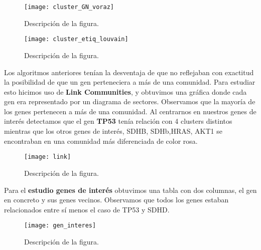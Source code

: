 \begin{figure}
	\centering
	\texttt{[image: cluster\_GN\_voraz]}
	\caption{Descripción de la figura.}
	\label{fig:cluster_GN_voraz}
\end{figure} 

\begin{figure}
	\centering
	\texttt{[image: cluster\_etiq\_louvain]}
	\caption{Descripción de la figura.}
	\label{fig:cluster_etiq_louvain}
\end{figure}

Los algoritmos anteriores tenían la desventaja de que no reflejaban con exactitud la posibilidad de que un gen perteneciera a más de una comunidad. Para estudiar esto hicimos uso de \textbf{Link Communities}, y obtuvimos una gráfica donde cada gen era representado por un diagrama de sectores. Observamos que la mayoría de los genes pertenecen a más de una comunidad. Al centrarnos en nuestros genes de interés detectamos que el gen \textbf{TP53} tenía relación con 4 clusters distintos mientras que los otros genes de interés, SDHB, SDHb,HRAS, AKT1 se encontraban en una comunidad más diferenciada de color rosa. 

\begin{figure}
	\centering
	\texttt{[image: link]}
	\caption{Descripción de la figura.}
	\label{fig:link}
\end{figure}



Para el \textbf{estudio genes de interés} obtuvimos una tabla con dos columnas, el gen en concreto y sus genes vecinos. Observamos que todos los genes estaban relacionados entre sí menos el caso de TP53 y SDHD. 

\begin{figure}
	\centering
	\texttt{[image: gen\_interes]}
	\caption{Descripción de la figura.}
	\label{fig:gen_interes}
\end{figure}

